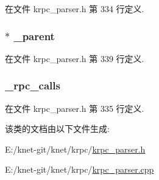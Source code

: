 在文件 krpc\+\_\+parser.\+h 第 334 行定义.

\hypertarget{classkrpc__parser__t_a76215a2f96b4cacaf59f61bcd2217849}{}
\subsubsection[{\+\_\+parent}]{$\ast$ \+\_\+parent\hspace{0.3cm}{\ttfamily [private]}}\label{classkrpc__parser__t_a76215a2f96b4cacaf59f61bcd2217849}


在文件 krpc\+\_\+parser.\+h 第 339 行定义.

\hypertarget{classkrpc__parser__t_a384832cb4d7e8e7dd7fbc4e51e5ccf12}{}
\subsubsection[{\+\_\+rpc\+\_\+calls}]{ \+\_\+rpc\+\_\+calls\hspace{0.3cm}{\ttfamily [private]}}\label{classkrpc__parser__t_a384832cb4d7e8e7dd7fbc4e51e5ccf12}


在文件 krpc\+\_\+parser.\+h 第 335 行定义.



该类的文档由以下文件生成\+:\begin{DoxyCompactItemize}
\item 
E\+:/knet-\/git/knet/krpc/\hyperlink{krpc__parser_8h}{krpc\+\_\+parser.\+h}\item 
E\+:/knet-\/git/knet/krpc/\hyperlink{krpc__parser_8cpp}{krpc\+\_\+parser.\+cpp}\end{DoxyCompactItemize}
